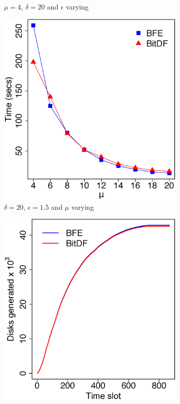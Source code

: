 \begin{figure}
\begin{subfigure}[t]{0.25\textwidth}
        \caption{$\mu = 4$, $\delta = 20$ and $\epsilon$ varying}
        \label{fig:trucks_vary_g}
    \end{subfigure}
    \begin{subfigure}[t]{0.25\textwidth}
        \includegraphics[width=\textwidth]{images/Trucks_l_20_g_1_5_varying_n.eps}
        \caption{$\delta = 20$, $\epsilon = 1.5$ and $\mu$ varying}
        \label{fig:trucks_vary_n}
    \end{subfigure}
    \begin{subfigure}[t]{0.25\textwidth}
        \includegraphics[width=\textwidth]{images/Trucks_d.eps}

\end{subfigure}
\end{figure}
